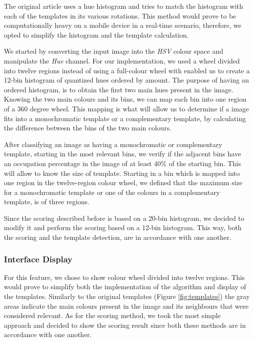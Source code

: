 The original article uses a hue histogram and tries to match the histogram with each of the templates in its various rotations. This method would prove to be computationally heavy on a mobile device in a real-time scenario, therefore, we opted to simplify the histogram and the template calculation. 

We started by converting the input image into the \emph{HSV} colour space and manipulate the \emph{Hue} channel. For our implementation, we used a wheel divided into twelve regions instead of using a full-colour wheel with enabled us to create a 12-bin histogram of quantized hues ordered by amount. The purpose of having an ordered histogram, is to obtain the first two main hues present in the image. Knowing the two main colours and its bins, we can map each bin into one region of a 360 degree wheel. This mapping is what will allow us to determine if a image fits into a monochromatic template or a complementary template, by calculating the difference between the bins of the two main colours.

After classifying an image as having a monochromatic or complementary template, starting in the most relevant bins, we verify if the adjacent bins have an occupation percentage in the image of at least 40\% of the starting bin. This will allow to know the size of template. Starting in a bin which is mapped into one region in the twelve-region colour wheel, we defined that the maximum size for a monochromatic template or one of the colours in a complementary template, is of three regions.

Since the scoring described before is based on a 20-bin histogram, we decided to modify it and perform the scoring based on a 12-bin histogram. This way, both the scoring and the template detection, are in accordance with one another.

\subsubsection{Interface Display}

For this feature, we chose to show colour wheel divided into twelve regions. This would prove to simplify both the implementation of the algorithm and display of the templates. Similarly to the original templates (Figure \ref{fig:templates}) the gray areas indicate the main colours present in the image and its neighbours that were considered relevant.
As for the scoring method, we took the most simple approach and decided to show the scoring result since both these methods are in accordance with one another.

